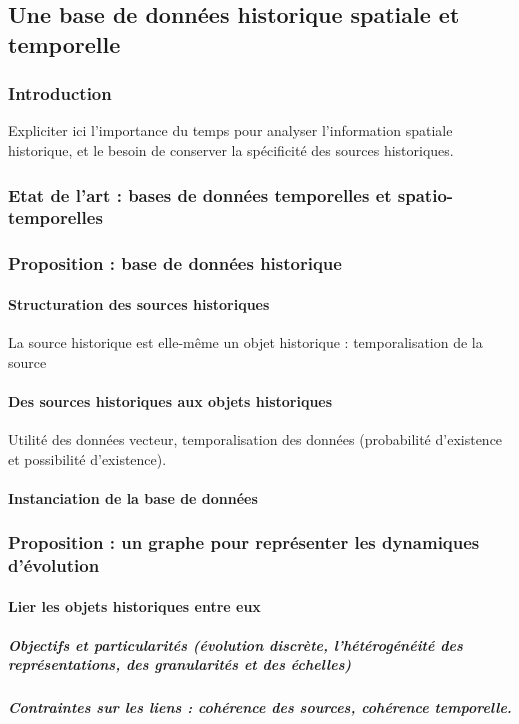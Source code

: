 \documentclass[a4paper,10pt]{article}
\begin{document}
\subsection{Une base de données historique spatiale et temporelle}
\subsubsection{Introduction}
Expliciter ici l'importance du temps pour analyser l'information spatiale historique, et 
le besoin de conserver la spécificité des sources historiques.

\subsubsection{Etat de l'art : bases de données temporelles et spatio-temporelles}

\subsubsection{Proposition : base de données historique}
\paragraph{Structuration des sources historiques}
La source historique est elle-même un objet historique : temporalisation de la source
\paragraph{Des sources historiques aux objets historiques}
Utilité des données vecteur, temporalisation des données (probabilité d'existence et possibilité d'existence).\\
\paragraph{Instanciation de la base de données}

\subsubsection{Proposition : un graphe pour représenter les dynamiques d'évolution}
\paragraph{Lier les objets historiques entre eux}
\subparagraph{Objectifs et particularités (évolution discrète, l'hétérogénéité des représentations, des granularités et des échelles) }
\subparagraph{Contraintes sur les liens : cohérence des sources, cohérence temporelle. }
\end{document}
